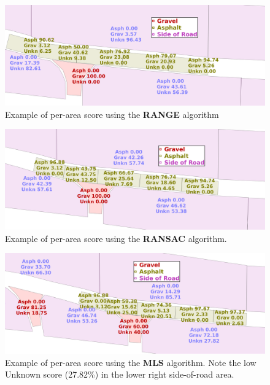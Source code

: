 \documentclass[numbered,pdftex]{ohio-etd}
\begin{document}
{{		\begin{figure}[H]
			\centering
			\includegraphics[width=0.95\linewidth]{Defense_Images/range_actual_rm_db_4_area_score}
			\caption[Area Scores: RANGE]{Example of per-area score using the \textbf{RANGE} algorithm}
			\label{fig:range_example_area_score}
		\end{figure}
	
		\begin{figure}[H]
			\centering
			\includegraphics[width=0.95\linewidth]{Defense_Images/ransac_actual_db_4_area_score}
			\caption[Area Scores: RANSAC]{Example of per-area score using the \textbf{RANSAC} algorithm.}
			\label{fig:ransac_example_area_score}
		\end{figure}
	
		\begin{figure}[H]
			\centering
			\includegraphics[width=0.95\linewidth]{Defense_Images/mls_db_4_area_scores}
			\caption[Area Scores: MLS]{Example of per-area score using the \textbf{MLS} algorithm. Note the low Unknown score (27.82\%) in the lower right side-of-road area.}
			\label{fig:mls_example_area_score}
		\end{figure}
	
}}
\end{document}
